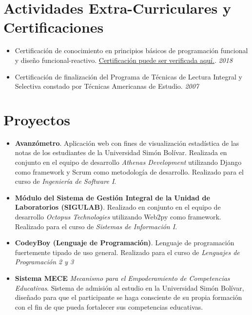 \documentclass[11pt,a4paper,sans,unicode]{moderncv}
\begin{document}
\section{Actividades Extra-Curriculares y Certificaciones}

\begin{itemize}
\item{Certificación de conocimiento en principios básicos de programación funcional y diseño funcional-reactivo. \href{https://www.coursera.org/account/accomplishments/certificate/2MHZ3UG58EHF}{Certificación puede ser verificada aquí.}. \emph{2018}
}
\item{Certificación de finalización del Programa de Técnicas de Lectura Integral y Selectiva constado por Técnicas Americanas de Estudio. \emph{2007}}
\end{itemize}

\section{Proyectos}

\begin{itemize}

\item{\textbf{Avanzómetro}. Aplicación web con fines de visualización estadística de las notas de los estudiantes de la Universidad Simón Bolívar. Realizada en conjunto en el equipo de desarrollo \emph{Athenas Development} utilizando Django como framework y Scrum como metodología de desarrollo. Realizado para el curso de \emph{Ingeniería de Software I}.}

\item{\textbf{Módulo del Sistema de Gestión Integral de la Unidad de Laboratorios (SIGULAB)}. Realizado en conjunto en el equipo de desarrollo \emph{Octopus Technologies} utilizando Web2py como framework. Realizado para el curso de \emph{Sistemas de Información I}.}

\item{\textbf{CodeyBoy (Lenguaje de Programación)}. Lenguaje de programación fuertemente tipado de uso general. Realizado para el curso de \emph{Lenguajes de Programación 2 y 3}}

\item{\textbf{Sistema MECE} \emph{Mecanismo para el Empoderamiento de Competencias Educativas}. Sistema de admisión al estudio en la Universidad Simón Bolívar,
diseñado para que el participante se haga consciente de su propia formación
con el fin de que pueda fortalecer sus competencias educativas.}

\end{itemize}
\nocite{*}

            
\end{document}
